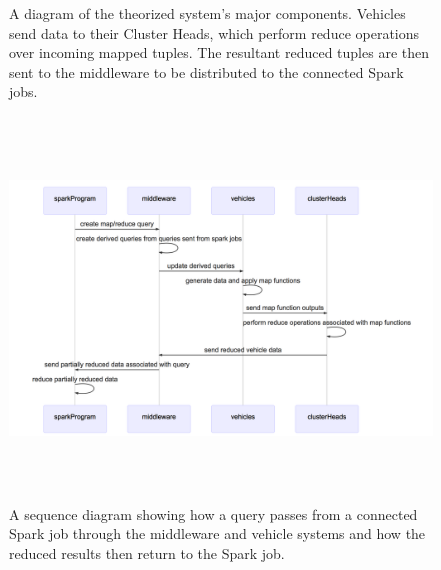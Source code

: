 \documentclass{thesis}
\begin{document}
\begin{figure}
        \caption{A diagram of the theorized system's major components. Vehicles
        send data to their Cluster Heads, which perform reduce operations over
        incoming mapped tuples. The resultant reduced tuples are then sent to
        the middleware to be distributed to the connected Spark jobs.}
        \label{fig:theoretical:component}
    \end{figure}
    \begin{figure}
        \centering
        \includegraphics[height=4in, width=6in]{binImages/theoretical-sequence.png}
        \caption{A sequence diagram showing how a query passes from a connected Spark job
        through the middleware and vehicle systems and how the reduced results then return
        to the Spark job.}
        \label{fig:theoretical:sequence}
    \end{figure}

\end{document}
